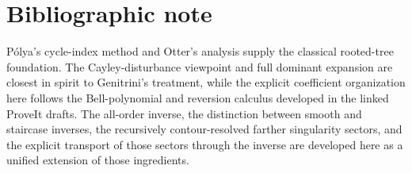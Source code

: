 \documentclass[11pt,a4paper,oneside,openany]{book}
\theoremstyle{definition}
\theoremstyle{remark}
\begin{document}
\backmatter

\chapter*{Bibliographic note}
P\'olya's cycle-index method and Otter's analysis supply the classical rooted-tree
foundation.  The Cayley-disturbance viewpoint and full dominant expansion are
closest in spirit to Genitrini's treatment, while the explicit coefficient
organization here follows the Bell-polynomial and reversion calculus developed
in the linked ProveIt drafts.  The all-order inverse, the distinction between
smooth and staircase inverses, the recursively contour-resolved farther
singularity sectors, and the explicit transport of those sectors through the
inverse are developed here as a unified extension of those ingredients.
\end{document}
